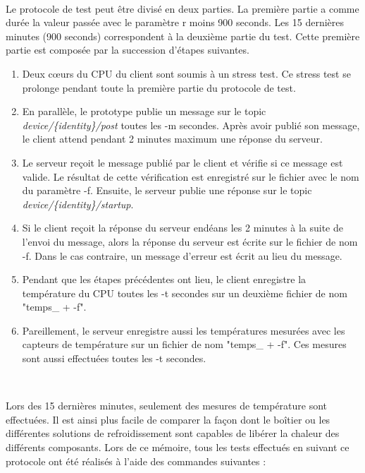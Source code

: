 ~

\noindent
Le protocole de test peut être divisé en deux parties. La première partie a comme durée la valeur passée avec le paramètre r moins 900 seconds. Les 15 dernières minutes (900 seconds) correspondent à la deuxième partie du test. Cette première partie est composée par la succession d’étapes suivantes.

\begin{enumerate}
  \item Deux cœurs du CPU du client sont soumis à un stress test. Ce stress test se prolonge pendant toute la première partie du protocole de test.
  \item En parallèle, le prototype publie un message sur le topic \textit{device/\{identity\}/post} toutes les -m secondes. Après avoir publié son message, le client attend pendant 2 minutes maximum une réponse du serveur.
  \item Le serveur reçoit le message publié par le client et vérifie si ce message est valide. Le résultat de cette vérification est enregistré sur le fichier avec le nom du paramètre -f. Ensuite, le serveur publie une réponse sur le topic \textit{device/\{identity\}/startup}.

  \item Si le client reçoit la réponse du serveur endéans les 2 minutes à la suite de l’envoi du message, alors la réponse du serveur est écrite sur le fichier de nom -f. Dans le cas contraire, un message d’erreur est écrit au lieu du message.

  \item Pendant que les étapes précédentes ont lieu, le client enregistre la température du CPU toutes les -t secondes sur un deuxième fichier de nom "temps\_ + -f".

  \item Pareillement, le serveur enregistre aussi les températures mesurées avec les capteurs de température sur un fichier de nom "temps\_ + -f". Ces mesures sont aussi effectuées toutes les -t secondes.
\end{enumerate}

~

\noindent
Lors des 15 dernières minutes, seulement des mesures de température sont effectuées. Il est ainsi plus facile de comparer la façon dont le boîtier ou les différentes solutions de refroidissement sont capables de libérer la chaleur des différents composants.
Lors de ce mémoire, tous les tests effectués en suivant ce protocole ont été réalisés à l’aide des commandes suivantes :

